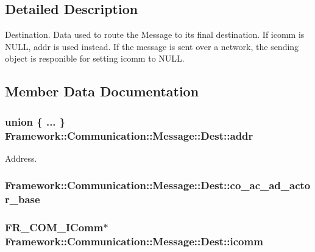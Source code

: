 \subsection{Detailed Description}
Destination. Data used to route the Message to its final destination. If icomm is NULL, addr is used instead. If the message is sent over a network, the sending object is responible for setting icomm to NULL. 

\subsection{Member Data Documentation}
\hypertarget{structFramework_1_1Communication_1_1Message_1_1Dest_ac7f87baccb2cd07e605d3ae1b4a713c1}{
\subsubsection[{addr}]{\setlength{\rightskip}{0pt plus 5cm}union \{ ... \}   {\bf Framework::Communication::Message::Dest::addr}}}
\label{structFramework_1_1Communication_1_1Message_1_1Dest_ac7f87baccb2cd07e605d3ae1b4a713c1}


Address. \hypertarget{structFramework_1_1Communication_1_1Message_1_1Dest_af22dbe20ca7387f9450d42bca01b04c7}{
\subsubsection[{co\_\-ac\_\-ad\_\-actor\_\-base}]{ {\bf Framework::Communication::Message::Dest::co\_\-ac\_\-ad\_\-actor\_\-base}}}
\label{structFramework_1_1Communication_1_1Message_1_1Dest_af22dbe20ca7387f9450d42bca01b04c7}
\hypertarget{structFramework_1_1Communication_1_1Message_1_1Dest_aa611b1a91261ddc29153c6ce2382f9f6}{
\subsubsection[{icomm}]{\setlength{\rightskip}{0pt plus 5cm}FR\_\-COM\_\-IComm$\ast$ {\bf Framework::Communication::Message::Dest::icomm}}}
\label{structFramework_1_1Communication_1_1Message_1_1Dest_aa611b1a91261ddc29153c6ce2382f9f6}


